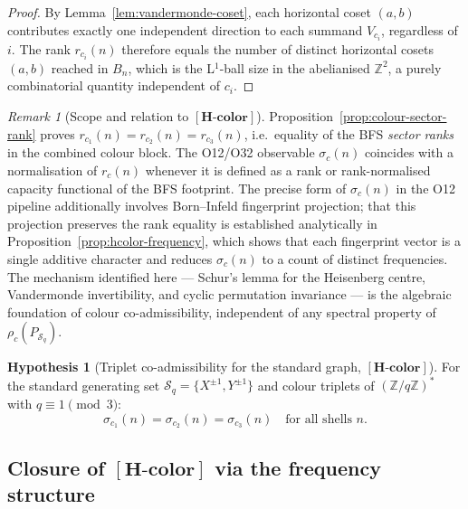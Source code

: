 \documentclass[11pt,a4paper]{article}
\theoremstyle{definition}
\newtheorem{hypothesis}[theorem]{Hypothesis}
\theoremstyle{remark}
\newtheorem{remark}[theorem]{Remark}
\newcommand{\Hcolor}{\mathbf{[H\text{-}color]}}
\newcommand{\Z}{\mathbb{Z}}
\newcommand{\Sq}{\mathcal{S}_q}
\begin{document}
      \begin{proof}
        By Lemma~\ref{lem:vandermonde-coset}, each horizontal coset $(a,b)$ contributes exactly one
        independent direction to each summand $V_{c_i}$, regardless of $i$.
        The rank $r_{c_i}(n)$ therefore equals the number of distinct horizontal cosets $(a,b)$
        reached in $B_n$, which is the L$^1$-ball size in the abelianised $\Z^2$,
        a purely combinatorial quantity independent of $c_i$.
      \end{proof}

      \begin{remark}[Scope and relation to $\Hcolor$]
        \label{rmk:vandermonde-scope}
        Proposition~\ref{prop:colour-sector-rank} proves $r_{c_1}(n) = r_{c_2}(n) = r_{c_3}(n)$,
        i.e.\ equality of the BFS \emph{sector ranks} in the combined colour block.
        The O12/O32 observable $\sigma_c(n)$ coincides with a normalisation of $r_c(n)$
        whenever it is defined as a rank or rank-normalised capacity functional of the BFS footprint.
        The precise form of $\sigma_c(n)$ in the O12 pipeline additionally involves Born--Infeld
        fingerprint projection; that this projection preserves the rank equality is established
        analytically in Proposition~\ref{prop:hcolor-frequency}, which shows that each fingerprint
        vector is a single additive character and reduces $\sigma_c(n)$ to a count of distinct
        frequencies.
        The mechanism identified here --- Schur's lemma for the Heisenberg centre, Vandermonde
        invertibility, and cyclic permutation invariance --- is the algebraic foundation of colour
        co-admissibility, independent of any spectral property of $\rho_c(P_{\Sq})$.
      \end{remark}

      \begin{hypothesis}[Triplet co-admissibility for the standard graph, $\Hcolor$]
        \label{hyp:h-color-std}
        For the standard generating set $\Sq = \{X^{\pm 1}, Y^{\pm 1}\}$ and colour triplets of
        $(\Z/q\Z)^*$ with $q \equiv 1 \pmod{3}$:
        \begin{equation}
          \label{eq:h-color-std}
          \sigma_{c_1}(n) = \sigma_{c_2}(n) = \sigma_{c_3}(n) \quad \text{for all shells } n.
        \end{equation}
      \end{hypothesis}

    \subsection{Closure of $\Hcolor$ via the frequency structure}
      \label{ssec:frequency-closure}
\end{document}

